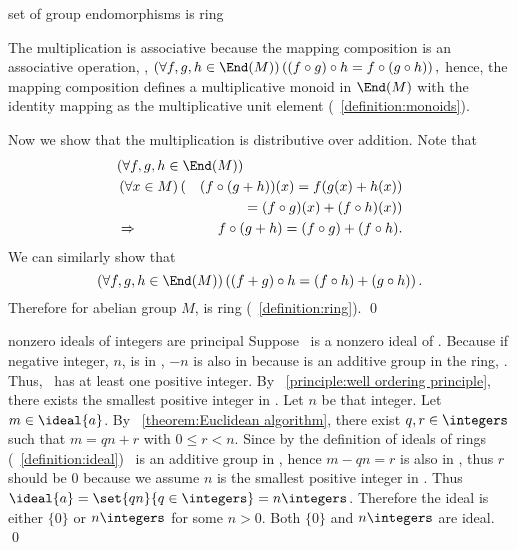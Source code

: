 \documentclass[17pt,landscape]{foils}
\begin{document}
{{{\begin{myproof}{set of group endomorphisms is ring}
\item
	The multiplication is associative because
	the mapping composition is an associative operation,
	\ie,
	$
		\left(
			\forall f,g,h \in \End(M)
		\right)
		\left(
			(f\circ g)\circ h
			= f\circ (g\circ h)
		\right),
	$
	hence, the mapping composition defines a multiplicative monoid in $\End(M)$
	with the identity mapping as the multiplicative unit element
	(~\ref{definition:monoids}).

\item
	Now we show that the multiplication is distributive over addition.
	Note that
	\begin{eqnarray*}
		\lefteqn{
		\left(
			\forall f,g,h \in \End(M)
		\right)
		}
		\\
		&
		\left(
			\forall x \in M
		\right)
		(&
			(f\circ(g+h))(x) = f(g(x) + h(x))
		\\&&
			= (f\circ g)(x) + (f\circ h)(x)
		)
		\\
		& \Rightarrow&
		f\circ(g+h) = (f\circ g) + (f\circ h).
	\end{eqnarray*}
	We can similarly show that
	$$
		\left(
			\forall f,g,h \in \End(M)
		\right)
		\left(
		(f+g)\circ h = (f\circ h) + (g\circ h)
		\right).
	$$
\eit
	Therefore
	for abelian group $M$,
	is ring
	(~\ref{definition:ring}).
	\qed\
\end{myproof}

\begin{myproof}{nonzero ideals of integers are principal}
	Suppose \ is a nonzero ideal of \integers.
	Because if negative integer, $n$, is in ,
	$-n$ is also in 
	because  is an additive group in the ring, \integers.
	Thus, \ideal{a}\ has at least one positive integer.
	By \principlename~\ref{principle:well ordering principle},
	there exists the smallest positive integer in .
	Let $n$ be that integer.
	Let $m\in\ideal{a}$.
	By \theoremname~\ref{theorem:Euclidean algorithm},
	there exist $q, r \in \integers$
	such that $m=qn + r$ with $0\leq r < n$.
	Since by the definition of ideals of rings (~\ref{definition:ideal})
	\ is an additive group in \integers,
	hence $m-qn = r$ is also in ,
	thus $r$ should be $0$
	because we assume $n$ is the smallest positive integer in \ideal{a}.
	Thus $\ideal{a} = \set{qn}{q\in\integers} = n\integers$.
	Therefore the ideal is either $\{0\}$ or $n\integers$ for some $n>0$.
	Both $\{0\}$ and $n\integers$ are ideal.
	\qed\
\end{myproof}

}}}
\end{document}
